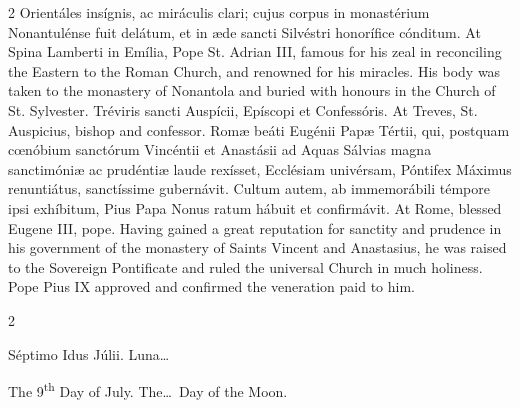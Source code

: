 \begin{paracol}{2}
 Orientáles insígnis, ac miráculis clari; cujus corpus in monastérium 
 Nonantulénse fuit delátum, et in æde sancti Silvéstri honorífice cónditum.
\switchcolumn
{}
At Spina Lamberti in Emília, Pope 
 St. Adrian III, famous for his zeal in reconciling the Eastern to the Roman 
 Church, and renowned for his miracles. His body was taken to the 
 monastery of Nonantola and buried with honours in the Church of St. 
 Sylvester.
\switchcolumn*
{}
Tréviris sancti 
 Auspícii, Epíscopi et Confessóris.
\switchcolumn
{}
At Treves, St. Auspicius, bishop and 
 confessor.
\switchcolumn*
{}
Romæ beáti Eugénii Papæ 
 Tértii, qui, postquam cœnóbium sanctórum Vincéntii et Anastásii ad Aquas 
 Sálvias magna sanctimóniæ ac prudéntiæ laude rexísset, Ecclésiam univérsam, 
 Póntifex Máximus renuntiátus, sanctíssime gubernávit. Cultum autem, ab 
 immemorábili témpore ipsi exhíbitum, Pius Papa Nonus ratum hábuit et 
 confirmávit.
\switchcolumn
{}
At Rome, blessed Eugene III, pope. 
 Having gained a great reputation for sanctity and prudence in his government 
 of the monastery of Saints Vincent and Anastasius, he was raised to the 
 Sovereign Pontificate and ruled the universal Church in much holiness. 
 Pope Pius IX approved and confirmed the veneration paid to him.
\switchcolumn*
{}
\end{paracol}


\begin{paracol}{2}
\begin{center}{\color{gregoriocolor} Séptimo Idus Júlii. 
 Luna\dots\ }\end{center}
\switchcolumn
{}
\begin{center}{\color{gregoriocolor} The 
 9\textsuperscript{th} Day of 
 July. The\dots\ Day of the Moon.}\end{center}
\end{paracol}

